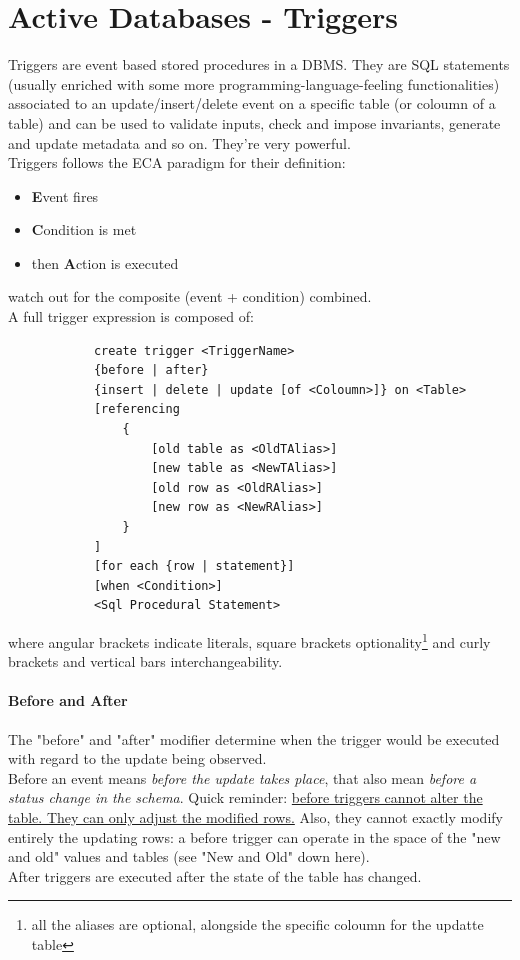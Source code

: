\documentclass{article}
\begin{document}
	\section{Active Databases - Triggers}
		Triggers are event based stored procedures in a DBMS. They are SQL statements (usually enriched with some more programming-language-feeling functionalities) associated to an update/insert/delete event on a specific table (or coloumn of a table) and can be used to validate inputs, check and impose invariants, generate and update metadata and so on. They're very powerful.\\
		Triggers follows the ECA paradigm for their definition:
		\begin{itemize}
			\item \textbf{E}vent fires
			\item \textbf{C}ondition is met
			\item then \textbf{A}ction is executed
		\end{itemize}
		watch out for the composite (event + condition) combined.\\
		A full trigger expression is composed of:
		\begin{verbatim}
			create trigger <TriggerName>
			{before | after}
			{insert | delete | update [of <Coloumn>]} on <Table>
			[referencing 
			    {
			        [old table as <OldTAlias>]
			        [new table as <NewTAlias>]
			        [old row as <OldRAlias>]
			        [new row as <NewRAlias>]
			    }
			]
			[for each {row | statement}]
			[when <Condition>]
			<Sql Procedural Statement>
		\end{verbatim}
		where angular brackets indicate literals, square brackets optionality\footnote{all the aliases are optional, alongside the specific coloumn for the updatte table} and curly brackets and vertical bars interchangeability.

		\paragraph{Before and After}
			The "before" and "after" modifier determine when the trigger would be executed with regard to the update being observed.\\
			Before an event means \textit{before the update takes place}, that also mean \textit{before a status change in the schema}. Quick reminder: \underline{before triggers cannot alter the table. They can only adjust the modified rows.} Also, they cannot exactly modify entirely the updating rows: a before trigger can operate in the space of the "new and old" values and tables (see "New and Old" down here).\\
			After triggers are executed after the state of the table has changed.
\end{document}
